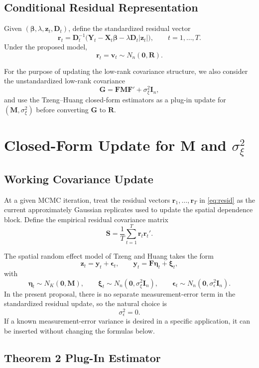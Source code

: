 \documentclass[11pt]{article}
\newcommand{\bY}{\mathbf{Y}}
\newcommand{\bX}{\mathbf{X}}
\newcommand{\bD}{\mathbf{D}}
\newcommand{\bF}{\mathbf{F}}
\newcommand{\bG}{\mathbf{G}}
\newcommand{\bM}{\mathbf{M}}
\newcommand{\bR}{\mathbf{R}}
\newcommand{\bS}{\mathbf{S}}
\newcommand{\bz}{\mathbf{z}}
\newcommand{\br}{\mathbf{r}}
\newcommand{\bzero}{\mathbf{0}}
\newcommand{\I}{\mathbf{I}}
\begin{document}
\subsection{Conditional Residual Representation}

Given $(\bm{\beta}, \lambda, \bz_t, \bD_t)$, define the standardized residual
vector
\begin{equation}
\br_t
=
\bD_t^{-1} \bigl( \bY_t - \bX_t \bm{\beta} - \lambda \bD_t |\bz_t| \bigr),
\qquad
t = 1, \ldots, T.
\label{eq:resid}
\end{equation}
Under the proposed model,
\[
\br_t = \mathbf{v}_t \sim N_n(\bzero, \bR).
\]

For the purpose of updating the low-rank covariance structure, we also consider
the unstandardized low-rank covariance
\[
\bG = \bF \bM \bF' + \sigma_\xi^2 \I_n,
\]
and use the Tzeng--Huang closed-form estimators as a plug-in update for
$(\bM, \sigma_\xi^2)$ before converting $\bG$ to $\bR$.

\section{Closed-Form Update for \texorpdfstring{$\bM$ and $\sigma_\xi^2$}{M and sigma-xi-squared}}

\subsection{Working Covariance Update}

At a given MCMC iteration, treat the residual vectors $\br_1, \ldots, \br_T$ in
\eqref{eq:resid} as the current approximately Gaussian replicates used to update
the spatial dependence block. Define the empirical residual covariance matrix
\[
\bS = \frac{1}{T} \sum_{t=1}^T \br_t \br_t'.
\]

The spatial random effect model of Tzeng and Huang takes the form
\[
\mathbf{z}_t = \mathbf{y}_t + \bm{\epsilon}_t,
\qquad
\mathbf{y}_t = \bF \bm{\eta}_t + \bm{\xi}_t,
\]
with
\[
\bm{\eta}_t \sim N_K(\bzero, \bM),
\qquad
\bm{\xi}_t \sim N_n(\bzero, \sigma_\xi^2 \I_n),
\qquad
\bm{\epsilon}_t \sim N_n(\bzero, \sigma_\epsilon^2 \I_n).
\]
In the present proposal, there is no separate measurement-error term in the
standardized residual update, so the natural choice is
\[
\sigma_\epsilon^2 = 0.
\]
If a known measurement-error variance is desired in a specific application, it
can be inserted without changing the formulas below.

\subsection{Theorem 2 Plug-In Estimator}
\end{document}
